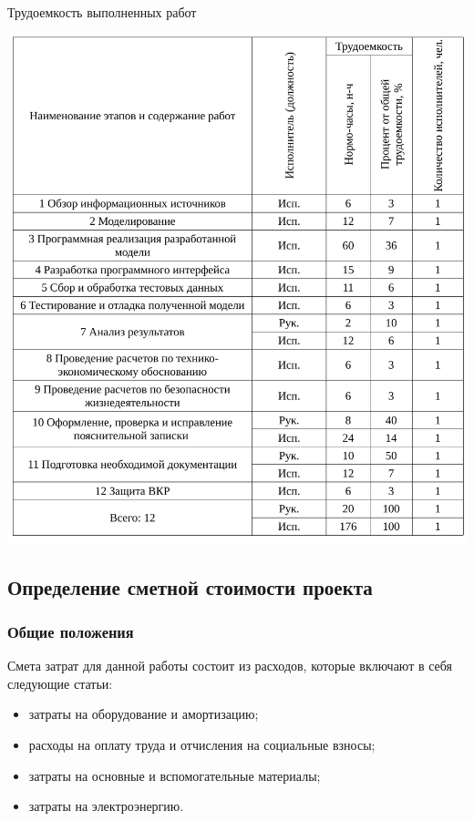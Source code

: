 \begin{table}[ht!]
\caption{Трудоемкость выполненных работ}
\centering
\includegraphics[page=1, width=1\linewidth]{tables/economics/schedule.pdf}
\label{tab:job_is_done_1}
\end{table}

\clearpage
\subsection{Определение сметной стоимости проекта}
\subsubsection{Общие положения}

Смета затрат для данной работы состоит из расходов, которые включают в себя следующие статьи:

\begin{itemize}
\item затраты на оборудование и амортизацию;
\item расходы на оплату труда и отчисления на социальные взносы;
\item затраты на основные и вспомогательные материалы;
\item затраты на электроэнергию.
\end{itemize}
